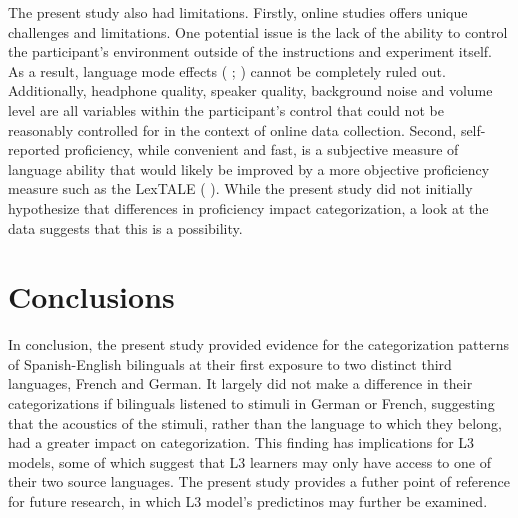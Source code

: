\documentclass[preprints]{Definitions/mdpi}
\begin{document}
The present study also had limitations.
Firstly, online studies offers unique challenges and limitations.
One potential issue is the lack of the ability to control the participant's environment outside of the instructions and experiment itself.
As a result, language mode effects (\citeauthor{grosjean1998transfer} \citeyear{grosjean1998transfer}; \citeauthor{casillas2018perceptual} \citeyear{casillas2018perceptual}) cannot be completely ruled out.
Additionally, headphone quality, speaker quality, background noise and volume level are all variables within the participant's control that could not be reasonably controlled for in the context of online data collection.
Second, self-reported proficiency, while convenient and fast, is a subjective measure of language ability that would likely be improved by a more objective proficiency measure such as the LexTALE (\citeauthor{lemhofer_introducing_2012} \citeyear{lemhofer_introducing_2012}).
While the present study did not initially hypothesize that differences in proficiency impact categorization, a look at the data suggests that this is a possibility.

\section{Conclusions}

In conclusion, the present study provided evidence for the categorization patterns of Spanish-English bilinguals at their first exposure to two distinct third languages, French and German.
It largely did not make a difference in their categorizations if bilinguals listened to stimuli in German or French, suggesting that the acoustics of the stimuli, rather than the language to which they belong, had a greater impact on categorization.
This finding has implications for L3 models, some of which suggest that L3 learners may only have access to one of their two source languages.
The present study provides a futher point of reference for future research, in which L3 model's predictinos may further be examined.


\end{document}
